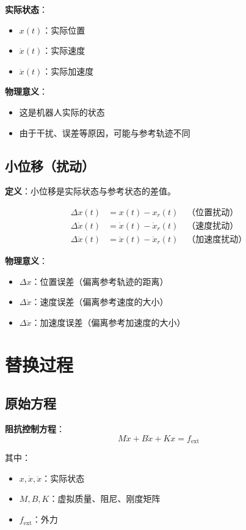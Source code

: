 \documentclass[12pt,a4paper]{article}
\begin{document}
\textbf{实际状态}：
\begin{itemize}
\item $x(t)$：实际位置
\item $\dot{x}(t)$：实际速度
\item $\ddot{x}(t)$：实际加速度
\end{itemize}

\textbf{物理意义}：
\begin{itemize}
\item 这是机器人实际的状态
\item 由于干扰、误差等原因，可能与参考轨迹不同
\end{itemize}

\subsection{小位移（扰动）}

\textbf{定义}：小位移是实际状态与参考状态的差值。

\begin{align}
\Delta x(t) &= x(t) - x_r(t) \quad \text{（位置扰动）} \\
\Delta \dot{x}(t) &= \dot{x}(t) - \dot{x}_r(t) \quad \text{（速度扰动）} \\
\Delta \ddot{x}(t) &= \ddot{x}(t) - \ddot{x}_r(t) \quad \text{（加速度扰动）}
\end{align}

\textbf{物理意义}：
\begin{itemize}
\item $\Delta x$：位置误差（偏离参考轨迹的距离）
\item $\Delta \dot{x}$：速度误差（偏离参考速度的大小）
\item $\Delta \ddot{x}$：加速度误差（偏离参考加速度的大小）
\end{itemize}

\section{替换过程}

\subsection{原始方程}

\textbf{阻抗控制方程}：
\begin{equation}
M\ddot{x} + B\dot{x} + Kx = f_{\text{ext}} \tag{11.64}
\end{equation}

其中：
\begin{itemize}
\item $x, \dot{x}, \ddot{x}$：实际状态
\item $M, B, K$：虚拟质量、阻尼、刚度矩阵
\item $f_{\text{ext}}$：外力
\end{itemize}
\end{document}
